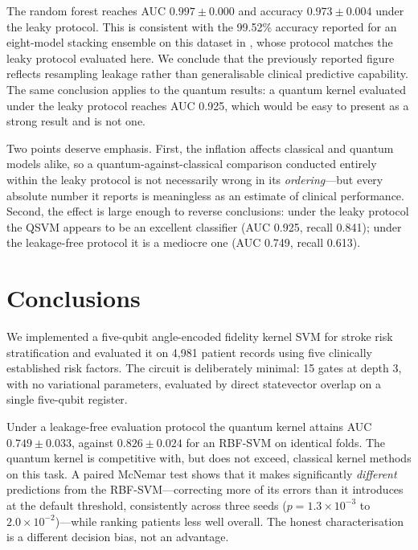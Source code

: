 \documentclass{ws-ijqi}
\begin{document}
The random forest reaches AUC $0.997\pm0.000$ and accuracy $0.973\pm0.004$
under the leaky protocol. This is consistent with the 99.52\% accuracy reported
for an eight-model stacking ensemble on this dataset in
, whose protocol matches the leaky protocol evaluated
here. We conclude that the previously reported figure reflects resampling
leakage rather than generalisable clinical predictive capability. The same
conclusion applies to the quantum results: a quantum kernel evaluated under the
leaky protocol reaches AUC 0.925, which would be easy to present as a strong
result and is not one.

Two points deserve emphasis. First, the inflation affects classical and quantum
models alike, so a quantum-against-classical comparison conducted entirely
within the leaky protocol is not necessarily wrong in its \emph{ordering}---but
every absolute number it reports is meaningless as an estimate of clinical
performance. Second, the effect is large enough to reverse conclusions: under
the leaky protocol the QSVM appears to be an excellent classifier
(AUC 0.925, recall 0.841); under the leakage-free protocol it is a mediocre one
(AUC 0.749, recall 0.613).

\section{Conclusions}
\label{sec:conclusions}

We implemented a five-qubit angle-encoded fidelity kernel SVM for stroke risk
stratification and evaluated it on 4,981 patient records using five clinically
established risk factors. The circuit is deliberately minimal: 15 gates at
depth 3, with no variational parameters, evaluated by direct statevector
overlap on a single five-qubit register.

Under a leakage-free evaluation protocol the quantum kernel attains AUC
$0.749\pm0.033$, against $0.826\pm0.024$ for an RBF-SVM on identical folds. The
quantum kernel is competitive with, but does not exceed, classical kernel
methods on this task. A paired McNemar test shows that it makes significantly
\emph{different} predictions from the RBF-SVM---correcting more of its errors
than it introduces at the default threshold, consistently across three seeds
($p = 1.3\times10^{-3}$ to $2.0\times10^{-2}$)---while ranking patients less
well overall. The honest characterisation is a different decision bias, not an
advantage.
\end{document}
